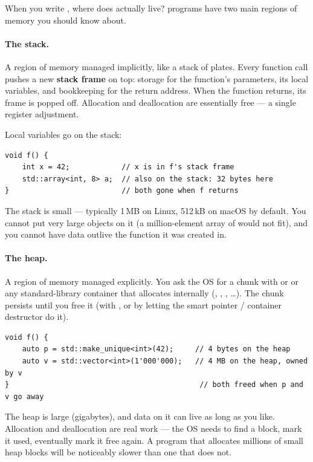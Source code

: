 When you write , where does  actually
live? \cpp{} programs have two main regions of memory you should
know about.

\paragraph{The stack.}
A region of memory managed implicitly, like a stack of plates. Every
function call pushes a new \textbf{stack frame} on top: storage for
the function's parameters, its local variables, and bookkeeping for
the return address. When the function returns, its frame is popped
off. Allocation and deallocation are essentially free --- a single
register adjustment.

Local variables go on the stack:

\begin{lstlisting}
void f() {
    int x = 42;            // x is in f's stack frame
    std::array<int, 8> a;  // also on the stack: 32 bytes here
}                          // both gone when f returns
\end{lstlisting}

The stack is small --- typically 1\,MB on Linux, 512\,kB on macOS
by default. You cannot put very large objects on it (a million-element
array of  would not fit), and you cannot have data outlive
the function it was created in.

\paragraph{The heap.}
A region of memory managed explicitly. You ask the OS for a chunk
with  or  or any
standard-library container that allocates internally
(, , , \dots).
The chunk persists until you free it (with , or by
letting the smart pointer / container destructor do it).

\begin{lstlisting}
void f() {
    auto p = std::make_unique<int>(42);     // 4 bytes on the heap
    auto v = std::vector<int>(1'000'000);   // 4 MB on the heap, owned by v
}                                            // both freed when p and v go away
\end{lstlisting}

The heap is large (gigabytes), and data on it can live as long as
you like. Allocation and deallocation are real work --- the OS needs
to find a block, mark it used, eventually mark it free again. A
program that allocates millions of small heap blocks will be
noticeably slower than one that does not.

